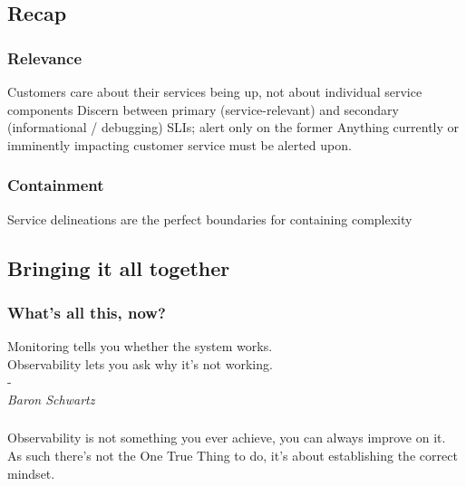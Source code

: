 \documentclass[aspectratio=169]{beamer}
\begin{document}
\subsection{Recap}

\begin{frame}
	\frametitle{Relevance}
	\begin{center}
		\vfill
		Customers care about their services being up, not about individual service components
		\vfill
		Discern between primary (service-relevant) and secondary (informational / debugging) SLIs; alert only on the former
		\vfill
		Anything currently or imminently impacting customer service must be alerted upon.
		\vfill
	\end{center}
\end{frame}

\begin{frame}
	\frametitle{Containment}
	\begin{center}
		\vfill
		Service delineations are the perfect boundaries for containing complexity
		\vfill
	\end{center}
\end{frame}



\subsection{Bringing it all together}

\begin{frame}
	\frametitle{What's all this, now?}
	\begin{center}
		\vfill
		Monitoring tells you whether the system works.\\
		Observability lets you ask why it’s not working.\\
		-\\
		\textit{Baron Schwartz}
		\vfill
	\end{center}
\end{frame}

\begin{frame}
	\frametitle{}
	\begin{center}
		\vfill
		Observability is not something you ever achieve, you can always improve on it.\\
		\vfill
		As such there's not the One True Thing to do, it's about establishing the correct mindset.
		\vfill
	\end{center}
\end{frame}
\end{document}
